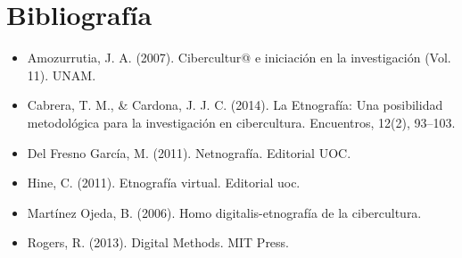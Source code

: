 \documentclass[]{book}
\providecommand{\tightlist}{%
  \setlength{\itemsep}{0pt}\setlength{\parskip}{0pt}}
\begin{document}
\hypertarget{bibliografuxeda-3}{%
\section*{Bibliografía}\label{bibliografuxeda-3}}

\begin{itemize}
\tightlist
\item
  Amozurrutia, J. A. (2007). Cibercultur@ e iniciación en la investigación (Vol. 11). UNAM.
\item
  Cabrera, T. M., \& Cardona, J. J. C. (2014). La Etnografía: Una posibilidad metodológica para la investigación en cibercultura. Encuentros, 12(2), 93--103.
\item
  Del Fresno García, M. (2011). Netnografía. Editorial UOC.
\item
  Hine, C. (2011). Etnografía virtual. Editorial uoc.
\item
  Martínez Ojeda, B. (2006). Homo digitalis-etnografía de la cibercultura.
\item
  Rogers, R. (2013). Digital Methods. MIT Press.
\end{itemize}


\end{document}
